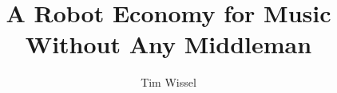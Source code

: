 \documentclass[whitelogo]{tudelft-report}
\begin{document}
\frontmatter


\title[tudelft-white]{A Robot Economy for Music Without Any Middleman}
\author[tudelft-white]{Tim Wissel}
\makecover[split]






\tableofcontents

\mainmatter








\appendix

%


\end{document}
